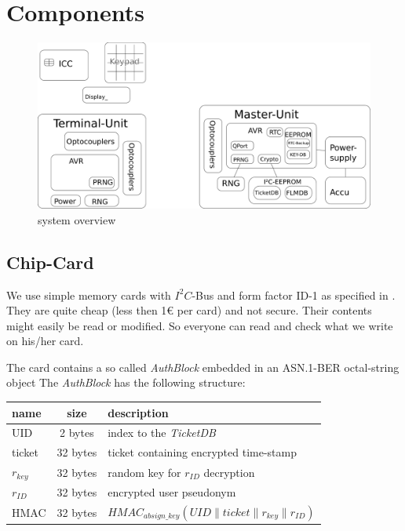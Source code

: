 \section{Components}
\begin{figure}
\includegraphics[scale=0.17]{Overview} 
\caption{system overview}
\end{figure}


\subsection{Chip-Card}
We use simple memory cards with $I^2C$-Bus\cite{I2C} and form factor ID-1 as specified in \cite{ISO7816-1}\cite{ISO7816-2}. They are quite cheap (less then 1\euro{} per card) and not secure. Their contents might easily be read or modified. So everyone can read and check what we write on his/her card.

The card contains a so called \textit{AuthBlock} embedded in an ASN.1-BER\cite{ASN.1BER} octal-string object
The \textit{AuthBlock} has the following structure:\\
\begin{tabular}{|l|c|l|} \hline
name & size & description \\ \hline 
UID            & 2 bytes & index to the \textit{TicketDB} \\
ticket         & 32 bytes & ticket containing encrypted time-stamp \\
$r_{key}$ & 32 bytes & random key for $r_{ID}$ decryption \\
$r_{ID}$   & 32 bytes & encrypted user pseudonym \\
HMAC        & 32 bytes & $HMAC_{absign\_key}(UID \parallel ticket \parallel r_{key} \parallel r_{ID})$\\ \hline
\end{tabular} 

